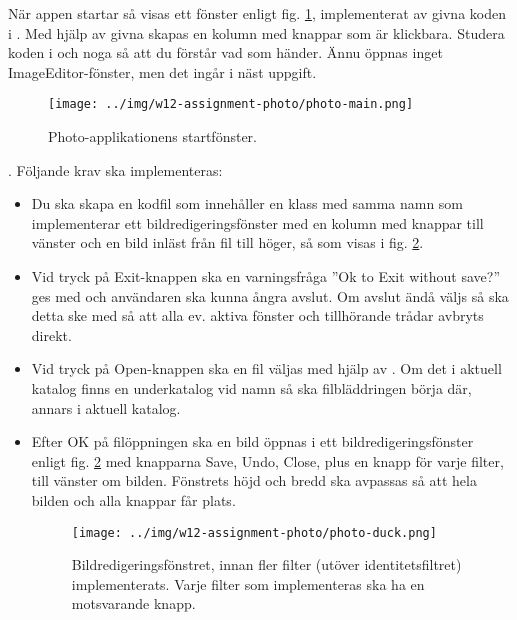 När appen startar så visas ett fönster enligt fig. \ref{photo:fig:main-window}, implementerat av givna koden i . Med hjälp av givna  skapas en kolumn med knappar som är klickbara. Studera koden i  och  noga så att du förstår vad som händer. Ännu öppnas inget ImageEditor-fönster, men det ingår i näst uppgift.

\begin{figure}[H]
\centering
\texttt{[image: ../img/w12-assignment-photo/photo-main.png]}
\caption{Photo-applikationens startfönster.}
\label{photo:fig:main-window}
\end{figure}

\Task \textbf{}. Följande krav ska implementeras: 

\begin{itemize}
\item Du ska skapa en kodfil  som innehåller en klass med samma namn som implementerar ett bildredigeringsfönster med en kolumn med knappar till vänster och en bild inläst från fil till höger, så som visas i fig. \ref{photo:fig:editor-one-filter}. 

\item Vid tryck på Exit-knappen ska en varningsfråga ''Ok to Exit without save?'' ges med  och användaren ska kunna ångra avslut. Om avslut ändå väljs så ska detta ske med  så att alla ev. aktiva fönster och tillhörande trådar avbryts direkt.

\item Vid tryck på Open-knappen ska en fil väljas med hjälp av . Om det i aktuell katalog finns en underkatalog vid namn  så ska filbläddringen börja där, annars i aktuell katalog. 

\item Efter OK på filöppningen ska en bild öppnas i ett bildredigeringsfönster enligt fig. \ref{photo:fig:editor-one-filter} med knapparna Save, Undo, Close, plus en knapp för varje filter, till vänster om bilden. Fönstrets höjd och bredd ska avpassas så att hela bilden och alla knappar får plats.

\begin{figure}
\centering
\texttt{[image: ../img/w12-assignment-photo/photo-duck.png]}
\caption{Bildredigeringsfönstret, innan fler filter (utöver identitetsfiltret) implementerats. Varje filter som implementeras ska ha en motsvarande knapp.}
\label{photo:fig:editor-one-filter}
\end{figure}


\end{itemize}
